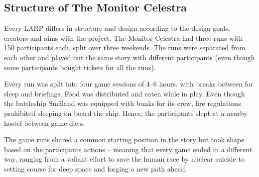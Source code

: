 \subsection{Structure of The Monitor Celestra}
Every LARP differs in structure and design according to the design goals, creators and aims with the project. The Monitor Celestra had three runs with 150 participants each, split over three weekends. The runs were separated from each other and played out the same story with different participants (even though some participants bought tickets for all the runs). 

Every run was split into four game sessions of 4--6 hours, with breaks between for sleep and briefings. Food was distributed and eaten while in play. Even though the battleship Småland was equipped with bunks for its crew, fire regulations prohibited sleeping on board the ship. Hence, the participants slept at a nearby hostel between game days.

The game runs shared a common starting position in the story but took shape based on the participants actions -- meaning that every game ended in a different way, ranging from a valiant effort to save the human race by nuclear suicide to setting course for deep space and forging a new path ahead. 



